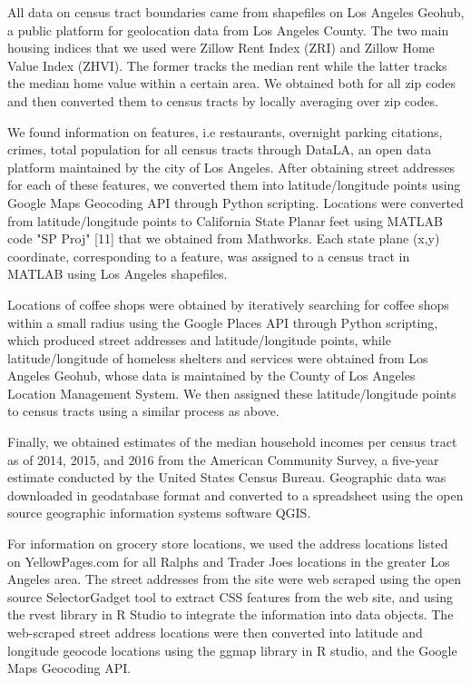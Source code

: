 \documentclass[11pt,letterpaper]{article}
\begin{document}
All data on census tract boundaries came from shapefiles on Los Angeles Geohub, a public platform for
geolocation data from Los Angeles County. The two main housing indices that we used were Zillow Rent Index (ZRI) and Zillow Home Value Index (ZHVI). The former tracks the median rent while the latter tracks the median home value within a certain area. We obtained both for all zip codes and then converted them to census tracts by locally averaging over zip codes.

We found information on features, i.e restaurants, overnight parking citations, crimes, total population for all census tracts through DataLA, an open data platform maintained by the city of Los Angeles. After obtaining street addresses for each of these features, we converted them into latitude/longitude points using Google Maps Geocoding API through Python scripting. Locations were converted from latitude/longitude points to California State Planar feet using MATLAB code "SP Proj" [11] that we obtained from Mathworks. Each state plane (x,y) coordinate, corresponding to a feature, was assigned to a census tract in MATLAB using Los Angeles shapefiles.

Locations of coffee shops were obtained by iteratively searching for coffee shops within a small radius using the Google Places API through Python scripting, which produced street addresses and latitude/longitude points, while latitude/longitude of homeless shelters and services were obtained from Los Angeles Geohub, whose data is maintained by the County of Los Angeles Location Management System. We then assigned these latitude/longitude points to census tracts using a similar process as above.

Finally, we obtained estimates of the median household incomes per census tract as of 2014, 2015, and 2016 from the
American Community Survey, a five-year estimate conducted by the United States Census Bureau. Geographic data was downloaded in geodatabase format and converted to a spreadsheet using the open source
geographic information systems software QGIS.

For information on grocery store locations, we used the address locations listed on YellowPages.com for all Ralphs and Trader Joes locations in the greater Los Angeles area. The street addresses from the site were web scraped using the open source SelectorGadget tool to extract CSS features from the web site, and using the rvest library in R Studio to integrate the information into data objects. The web-scraped street address locations were then converted into latitude and longitude geocode locations using the ggmap library in R studio, and the Google Maps Geocoding API.
\end{document}
